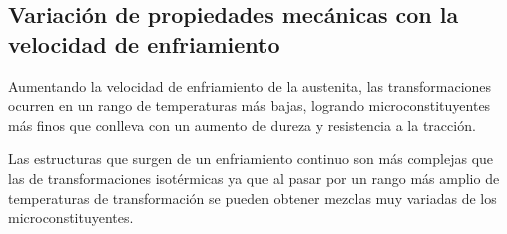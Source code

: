 \subsection{Variación de propiedades mecánicas con la velocidad de enfriamiento}
Aumentando la velocidad de enfriamiento de la austenita, las transformaciones ocurren en un rango de temperaturas más bajas, logrando microconstituyentes más finos que conlleva con un aumento de dureza y resistencia a la tracción. 

Las estructuras que surgen de un enfriamiento continuo son más complejas que las de transformaciones isotérmicas ya que al pasar por un rango más amplio de temperaturas de transformación se pueden obtener mezclas muy variadas de los microconstituyentes.